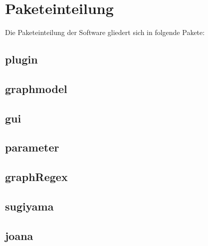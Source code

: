 \chapter{Paketeinteilung}

Die Paketeinteilung der Software gliedert sich in folgende Pakete: %

\section{plugin}

\section{graphmodel}

\section{gui}

\section{parameter}

\section{graphRegex}

\section{sugiyama}

\section{joana}